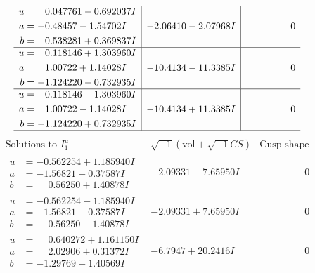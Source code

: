 \documentclass[1p]{elsarticle_modified}
\theoremstyle{definition}
\newcommand{\I}{\sqrt{-1}}
\begin{document}
$$\begin{array}{c|c|c}
\begin{aligned}
u &= \phantom{-}0.047761 - 0.692037 I \\
a &= -0.48457 - 1.54702 I \\
b &= \phantom{-}0.538281 + 0.369837 I\end{aligned}
 & -2.06410 - 2.07968 I & \phantom{-0.000000 } 0 \\ \hline\begin{aligned}
u &= \phantom{-}0.118146 + 1.303960 I \\
a &= \phantom{-}1.00722 + 1.14028 I \\
b &= -1.124220 - 0.732935 I\end{aligned}
 & -10.4134 - 11.3385 I & \phantom{-0.000000 } 0 \\ \hline\begin{aligned}
u &= \phantom{-}0.118146 - 1.303960 I \\
a &= \phantom{-}1.00722 - 1.14028 I \\
b &= -1.124220 + 0.732935 I\end{aligned}
 & -10.4134 + 11.3385 I & \phantom{-0.000000 } 0\\
 \hline 
 \end{array}$$\newpage$$\begin{array}{c|c|c}  
\text{Solutions to }I^u_{1}& \I (\text{vol} + \sqrt{-1}CS) & \text{Cusp shape}\\
 \hline 
\begin{aligned}
u &= -0.562254 + 1.185940 I \\
a &= -1.56821 - 0.37587 I \\
b &= \phantom{-}0.56250 + 1.40878 I\end{aligned}
 & -2.09331 - 7.65950 I & \phantom{-0.000000 } 0 \\ \hline\begin{aligned}
u &= -0.562254 - 1.185940 I \\
a &= -1.56821 + 0.37587 I \\
b &= \phantom{-}0.56250 - 1.40878 I\end{aligned}
 & -2.09331 + 7.65950 I & \phantom{-0.000000 } 0 \\ \hline\begin{aligned}
u &= \phantom{-}0.640272 + 1.161150 I \\
a &= \phantom{-}2.02906 + 0.31372 I \\
b &= -1.29769 + 1.40569 I\end{aligned}
 & -6.7947 + 20.2416 I & \phantom{-0.000000 } 0 \\ \hline\begin{aligned}

\end{aligned}
\end{array}$$
\end{document}
